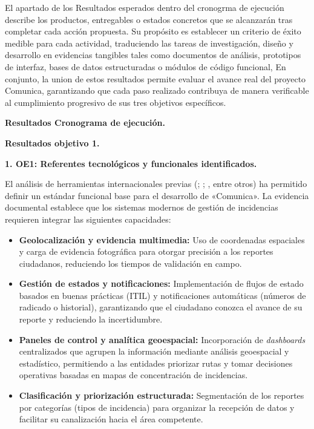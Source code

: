{   El apartado de los Resultados esperados dentro del cronogrma de ejecución describe los productos, entregables o estados concretos que se alcanzarán tras completar cada acción propuesta. Su propósito  es establecer un criterio de éxito medible para cada actividad, traduciendo las tareas de investigación, diseño y desarrollo en evidencias tangibles tales como documentos de análisis, prototipos de interfaz, bases de datos estructuradas o módulos de código funcional, En conjunto, la union de estos resultados permite evaluar el avance real del proyecto Comunica, garantizando que cada paso realizado contribuya de manera verificable al cumplimiento progresivo de sus tres objetivos específicos.
   
  \textbf{Resultados Cronograma de ejecución.} 
   
  \textbf{Resultados objetivo 1.}
   
\textbf{1. \hypertarget{subsec:SMS}{OE1}: Referentes tecnológicos y funcionales identificados.}

El análisis de herramientas internacionales previas (\cite{parrales2025desarrollo}; \cite{trejo2019sistema}; \cite{moreno2026diseno}, entre otros) ha permitido definir un estándar funcional base para el desarrollo de «Comunica». La evidencia documental establece que los sistemas modernos de gestión de incidencias requieren integrar las siguientes capacidades:

\begin{itemize}
	\item \textbf{Geolocalización y evidencia multimedia:} Uso de coordenadas espaciales y carga de evidencia fotográfica para otorgar precisión a los reportes ciudadanos, reduciendo los tiempos de validación en campo.
	
	\item \textbf{Gestión de estados y notificaciones:} Implementación de flujos de estado basados en buenas prácticas (ITIL) y notificaciones automáticas (números de radicado o historial), garantizando que el ciudadano conozca el avance de su reporte y reduciendo la incertidumbre.
	
	\item \textbf{Paneles de control y analítica geoespacial:} Incorporación de \textit{dashboards} centralizados que agrupen la información mediante análisis geoespacial y estadístico, permitiendo a las entidades priorizar rutas y tomar decisiones operativas basadas en mapas de concentración de incidencias.
	
	\item \textbf{Clasificación y priorización estructurada:} Segmentación de los reportes por categorías (tipos de incidencia) para organizar la recepción de datos y facilitar su canalización hacia el área competente.
	

\end{itemize}}
